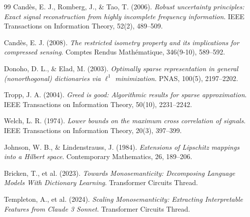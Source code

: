 \documentclass[11pt,a4paper]{article}
\theoremstyle{remark}
\begin{document}
\begin{thebibliography}{99}
Candès, E. J., Romberg, J., \& Tao, T. (2006).
\emph{Robust uncertainty principles: Exact signal reconstruction from highly incomplete frequency information}.
IEEE Transactions on Information Theory, 52(2), 489--509.

Candès, E. J. (2008).
\emph{The restricted isometry property and its implications for compressed sensing}.
Comptes Rendus Mathématique, 346(9-10), 589--592.

Donoho, D. L., \& Elad, M. (2003).
\emph{Optimally sparse representation in general (nonorthogonal) dictionaries via $\ell^1$ minimization}.
PNAS, 100(5), 2197--2202.

Tropp, J. A. (2004).
\emph{Greed is good: Algorithmic results for sparse approximation}.
IEEE Transactions on Information Theory, 50(10), 2231--2242.

Welch, L. R. (1974).
\emph{Lower bounds on the maximum cross correlation of signals}.
IEEE Transactions on Information Theory, 20(3), 397--399.

Johnson, W. B., \& Lindenstrauss, J. (1984).
\emph{Extensions of Lipschitz mappings into a Hilbert space}.
Contemporary Mathematics, 26, 189--206.

Bricken, T., et al. (2023).
\emph{Towards Monosemanticity: Decomposing Language Models With Dictionary Learning}.
Transformer Circuits Thread.

Templeton, A., et al. (2024).
\emph{Scaling Monosemanticity: Extracting Interpretable Features from Claude 3 Sonnet}.
Transformer Circuits Thread.

\end{thebibliography}
\end{document}
